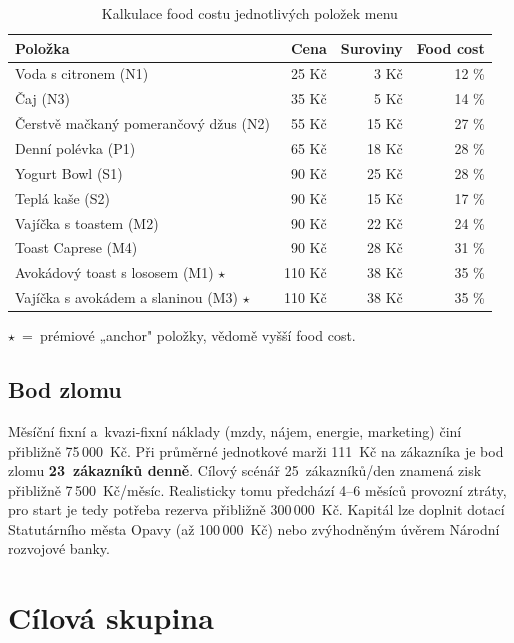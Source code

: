 \documentclass[12pt,a4paper]{article}
\begin{document}
\begin{table}[h]
  \centering
  \caption{Kalkulace food costu jednotlivých položek menu}
  \begin{tabularx}{\textwidth}{Y r r r}
    \toprule
    \textbf{Položka} & \textbf{Cena} & \textbf{Suroviny} & \textbf{Food cost} \\
    \midrule
    Voda s citronem (N1) & 25 Kč & 3 Kč & 12 \% \\
    Čaj (N3) & 35 Kč & 5 Kč & 14 \% \\
    Čerstvě mačkaný pomerančový džus (N2) & 55 Kč & 15 Kč & 27 \% \\
    Denní polévka (P1) & 65 Kč & 18 Kč & 28 \% \\
    Yogurt Bowl (S1) & 90 Kč & 25 Kč & 28 \% \\
    Teplá kaše (S2) & 90 Kč & 15 Kč & 17 \% \\
    Vajíčka s toastem (M2) & 90 Kč & 22 Kč & 24 \% \\
    Toast Caprese (M4) & 90 Kč & 28 Kč & 31 \% \\
    Avokádový toast s lososem (M1) $\star$ & 110 Kč & 38 Kč & 35 \% \\
    Vajíčka s avokádem a slaninou (M3) $\star$ & 110 Kč & 38 Kč & 35 \% \\
    \bottomrule
  \end{tabularx}

  \vspace{2pt}
  \footnotesize $\star$~=~prémiové „anchor" položky, vědomě vyšší food cost.
  \label{tab:foodcost}
\end{table}

\subsection{Bod zlomu}

Měsíční fixní a~kvazi-fixní náklady (mzdy, nájem, energie, marketing) činí přibližně 75\,000~Kč. Při průměrné jednotkové marži 111~Kč na zákazníka je bod zlomu \textbf{23~zákazníků denně}. Cílový scénář 25~zákazníků/den znamená zisk přibližně 7\,500~Kč/měsíc. Realisticky tomu předchází 4--6 měsíců provozní ztráty, pro start je tedy potřeba rezerva přibližně 300\,000~Kč. Kapitál lze doplnit dotací Statutárního města Opavy (až 100\,000~Kč) nebo zvýhodněným úvěrem Národní rozvojové banky.

\section{Cílová skupina}
\end{document}
